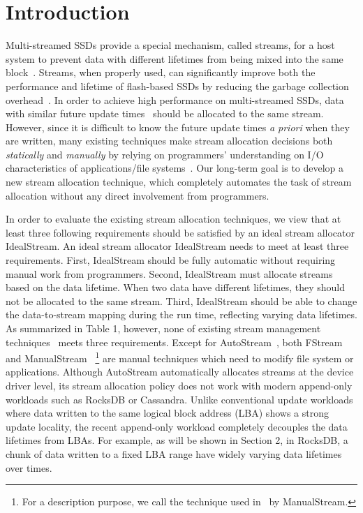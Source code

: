 \section{Introduction}
Multi-streamed SSDs provide a special mechanism,
called streams, for a host system to prevent data with different lifetimes 
from being mixed into the same block~\cite{MultiStream}.
Streams, when properly used, can significantly improve both the performance and lifetime of flash-based SSDs by reducing
the garbage collection overhead~\cite{MultiStream, FStream, AutoStream, Level}.  
In order to achieve high performance on multi-streamed SSDs, data with similar 
future update times~\cite{PCHa}
should be allocated to the same stream.
However, since it is difficult to know the future update times {\it a priori} when they are written,
many existing techniques make stream allocation decisions both {\it statically} and {\it manually} by relying on 
programmers' understanding on I/O characteristics of applications/file systems~\cite{MultiStream,FStream}.  
Our long-term goal is to develop a new stream allocation technique, 
which completely automates the task of stream allocation without any direct involvement from programmers.

In order to evaluate the existing stream allocation techniques, 
we view that at least three following  requirements should be satisfied 
by an ideal stream allocator {\sf IdealStream}.   
An ideal stream allocator {\sf IdealStream} needs to
meet at least three requirements.  
First, {\sf IdealStream} should be fully automatic without requiring manual work from
programmers.   
Second, {\sf IdealStream} must allocate streams based on the data lifetime.  
When two data have different lifetimes, they should not be allocated to the same stream.   
Third, {\sf IdealStream} should be able to change the data-to-stream mapping during the run time, 
reflecting varying data lifetimes.
As summarized in Table 1, however, none of existing stream management 
techniques~\cite{MultiStream,FStream,AutoStream} meets three requirements.  
Except for AutoStream~\cite{AutoStream}, 
both FStream~\cite{FStream} and ManualStream~\cite{MultiStream}
\footnote{For a description purpose, we call the technique 
used in~\cite{MultiStream} by ManualStream.}
are manual techniques 
which need to modify 
file system or applications.
Although AutoStream automatically allocates streams at the device driver level, 
its stream allocation policy does not work with modern append-only workloads such as RocksDB or Cassandra.  
Unlike conventional update workloads where data written to the same logical block address (LBA) 
shows a strong update locality, 
the recent append-only workload completely decouples the data lifetimes from LBAs.  
For example, as will be shown in Section 2, in RocksDB, 
a chunk of data written to a fixed 
LBA range have widely varying data lifetimes over times.  

